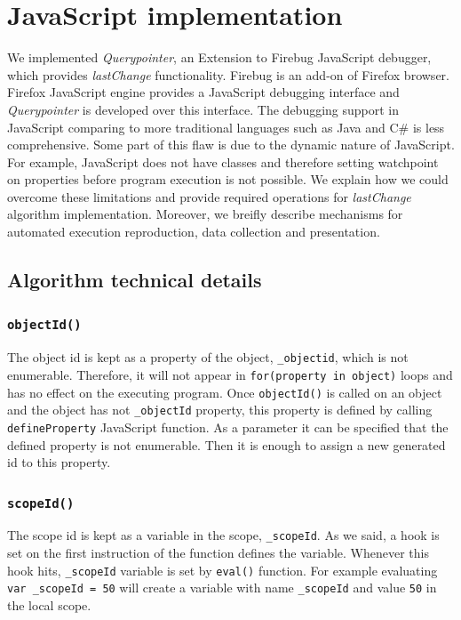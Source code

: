 \documentclass[preprint]{sigplanconf}
\begin{document}
\section{JavaScript implementation}
We implemented \textit{Querypointer}, an Extension to Firebug JavaScript debugger, which provides \textit{lastChange} functionality. Firebug is an add-on of Firefox browser. Firefox JavaScript engine provides a JavaScript debugging interface and \textit{Querypointer} is developed over this interface. The debugging support in JavaScript comparing to more traditional languages such as Java and C\# is less comprehensive. Some part of this flaw is due to the dynamic nature of JavaScript. For example, JavaScript does not have classes and therefore setting watchpoint on properties before program execution is not possible. We explain how we could overcome these limitations and provide required operations for \textit{lastChange} algorithm implementation. Moreover, we breifly describe mechanisms for automated execution reproduction, data collection and presentation.

\subsection{Algorithm technical details}
\subsubsection{\texttt{objectId()}}
The object id is kept as a property of the object, \texttt{\_objectid}, which is not enumerable. Therefore, it will not appear in \texttt{for(property in object)} loops and has no effect on the executing program. Once \texttt{objectId()} is called on an object and the object has not \texttt{\_objectId} property, this property is defined by calling \texttt{defineProperty} JavaScript function. As a parameter it can be specified that the defined property is not enumerable. Then it is enough to assign a new generated id to this property.

\subsubsection{\texttt{scopeId()}}
The scope id is kept as a variable in the scope, \texttt{\_scopeId}. As we said, a hook is set on the first instruction of the function defines the variable. Whenever this hook hits,  \texttt{\_scopeId} variable is set by \texttt{eval()} function. For example evaluating \texttt{var \_scopeId = 50} will create a variable with name \texttt{\_scopeId} and value \texttt{50} in the local scope.
\end{document}
